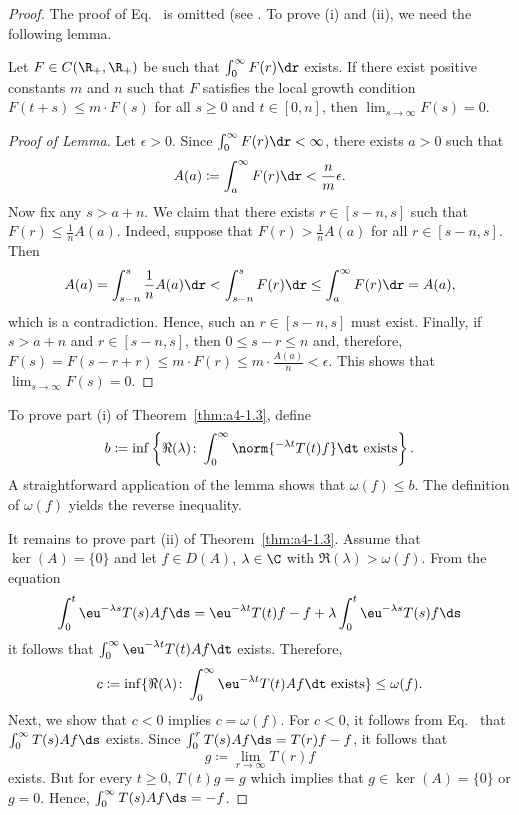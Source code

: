 \begin{proof}  The proof of Eq.~ is omitted (see \textcite[p.306]{hillephillips:1957}. 
To prove (i) and (ii), we need the following lemma.
\begin{lemma*}\label{lem:a4-1.3}
Let $F \in C(\R_{+},\R_{+})$ be such that $\int_{0}^{\infty} F(r) \dr$ exists. 
If there exist positive constants $m$ and $n$ such that $F$ satisfies the local growth condition $F(t + s) \leq m \cdot F(s)$ for all $s \geq 0$ and $t \in \left[0,n\right]$, then $\lim_{s \to \infty} F(s) = 0$.
\end{lemma*}
\begin{proof}[Proof of Lemma]
Let $\epsilon > 0$. Since $\int_0^\infty F(r) \dr < \infty$, there exists $a > 0$ such that
\[
A(a) \coloneqq \int_{a}^{\infty} F(r) \dr < \frac{n}{m}\epsilon.
\]
Now fix any $s > a + n$. We claim that there exists $r \in [s - n, s]$ such that
\(
F(r) \leq \frac{1}{n}A(a).
\)
Indeed, suppose that $F(r) > \frac{1}{n}A(a)$ for all $r \in [s - n, s]$. Then
\[ A(a) = \int_{s-n}^{s}\frac{1}{n}A(a)\dr < \int_{s-n}^{s}F(r)\dr \le \int_a^\infty F(r)\dr = A(a), \]
which is a contradiction.
Hence, such an $r \in [s - n, s]$ must exist.
Finally, if\/ $s>a+n$ and $r\in [s-n,s]$, then $0\le s-r\le n$ and, therefore, $F(s) = F(s-r+r) \leq m \cdot F(r) \leq m \cdot \frac{A(a)}{n} < \epsilon$. 
This shows that $\lim_{s \to \infty} F(s) = 0$.
\end{proof}
To prove part (i) of Theorem~\ref{thm:a4-1.3}, define 
%
\[
	b \coloneqq \inf \left\{\Re(\lambda)\colon\int_{0}^{\infty} \norm{^{-\lambda t} T(t)f}  \dt \text{ exists} \right\}.
\]
%
A straightforward application of the lemma shows that $\omega(f) \leq b$.
The definition of\/ $\omega(f)$ yields the reverse inequality.

It remains to prove part (ii) of Theorem~\ref{thm:a4-1.3}.
Assume that $\ker(A) = \{0\}$ and let $f \in D(A)$, $\lambda \in \C$ with $\Re(\lambda) > \omega(f)$. 
From the equation
\[
\int_{0}^{t} \eu^{-\lambda s} T(s)Af  \ds = \eu^{-\lambda t}T(t)f - f + \lambda \int_{0}^{t} \eu^{-\lambda s} T(s)f  \ds
\]
it follows that $\int_{0}^{\infty} \eu^{-\lambda t} T(t)Af  \dt$ exists. 
Therefore, 
\[c \coloneqq \inf\{\Re(\lambda)\colon\int_{0}^{\infty} \eu^{-\lambda t}T(t)Af  \dt \text{ exists}\} \leq \omega(f).\]
Next, we show that $c < 0$ implies $c = \omega(f)$. 
For $c < 0$, it follows from Eq.~ that $\int_{0}^{\infty} T(s)Af  \ds$ exists. 
Since $\int_{0}^{r} T(s)Af  \ds = T(r)f - f$, it follows that \[g \coloneqq\lim_{r \to \infty} T(r)f\] exists. 
But for every $t \geq 0$, $T(t)g = g$ which implies that $g \in \ker(A) = \{0\}$ or $g = 0$. 
Hence, $\int_{0}^{\infty} T(s)Af  \ds = -f$.


\end{proof}
